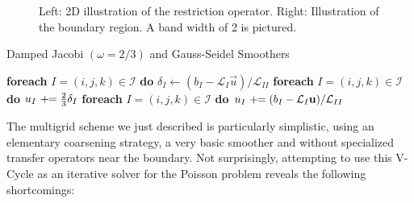 \begin{figure}[t]
\caption[2D restriction operator and boundary region]{Left: 2D illustration of the restriction operator. Right: Illustration of the boundary region. A band width of 2 is pictured.}
\label{fig_transfer_stencils}
\end{figure}

\begin{algorithm}[h]
\caption{Damped Jacobi $(\omega\!=\!2/3)$ and Gauss-Seidel Smoothers}
\label{alg_smoothers}
\begin{algorithmic}[1]
\State \textbf{foreach} $I=(i,j,k)\in\mathcal{I}$ \textbf{do}
\State \hspace*{1.em}$\delta_I\gets(b_I-\mathcal{L}_I\vec{u})/\mathcal{L}_{II}$
\State \textbf{foreach} $I=(i,j,k)\in\mathcal{I}$ \textbf{do}
\State \hspace*{1.em}$u_I\,\,+\!\!=\frac{2}{3}\delta_I$
\EndProcedure
{}
\State \textbf{foreach} $I=(i,j,k)\in\mathcal{I}$ \textbf{do}
\State \hspace*{1.em}$u_I\,\,+\!\!=(b_I-\mathcal{L}_I\hbox{$\mathbf{u}$})/\mathcal{L}_{II}$
\EndProcedure
\end{algorithmic}
\end{algorithm}


The multigrid scheme we just described is particularly simplistic, using an elementary coarsening strategy, a very basic smoother and without specialized transfer operators near the
boundary. Not surprisingly, attempting to use this V-Cycle as an iterative solver for the Poisson problem reveals the following shortcomings:

